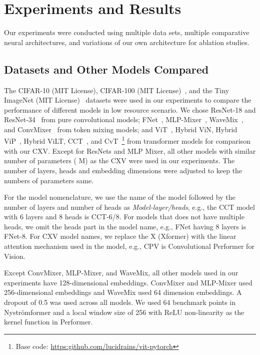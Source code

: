 \documentclass{article}
\begin{document}
\section{Experiments and Results}

Our experiments were conducted using multiple data sets, multiple comparative neural architectures, and variations of our own architecture for ablation studies.

\subsection{Datasets and Other Models Compared}

The CIFAR-10 (MIT License), CIFAR-100 (MIT License)~\cite{Krizhevsky09learningmultiple}, and the Tiny ImageNet (MIT License)~\cite{Le2015TinyIV} datasets were used in our experiments to compare the performance of different models in low resource scenario. We chose ResNet-18 and ResNet-34~\cite{he2015deep} from pure convolutional models; FNet~\cite{leethorp2021fnet}, MLP-Mixer~\cite{tolstikhin2021mlpmixer}, WaveMix~\cite{p2022wavemix}, and ConvMixer~\cite{anonymous2022patches} from token mixing models; and ViT~\cite{dosovitskiy2021image}, Hybrid ViN, Hybrid ViP~\cite{jeevan2021vision}, Hybrid ViLT, CCT~\cite{hassani2021escaping}, and CvT~\cite{wu2021cvt}\footnote{Base code: \href{https://github.com/lucidrains/vit-pytorch}{https:github.com/lucidrains/vit-pytorch}} from transformer models for comparison with our CXV. Except for ResNets and MLP Mixer, all other models with similar number of parameters ( M) as the CXV were used in our experiments. The number of layers, heads and embedding dimensions were adjusted to keep the numbers of parameters same. 

For the model nomenclature, we use the name of the model followed by the number of layers and number of heads as \emph{Model-layer/heads}, e.g., the CCT model with 6 layers and 8 heads is CCT-6/8. For models that does not have multiple heads, we omit the heads part in the model name, e.g., FNet having 8 layers is FNet-8. For CXV model names, we replace the X (Xformer) with the linear attention mechanism used in the model, e.g., CPV is Convolutional Performer for Vision.

Except ConvMixer, MLP-Mixer, and WaveMix, all other models used in our experiments have 128-dimensional embeddings. ConvMixer and MLP-Mixer used 256-dimensional embeddings and WaveMix used 64 dimension embeddings. A dropout of 0.5 was used across all models. We used 64 benchmark points in Nyströmformer and a local window size of 256 with ReLU non-linearity as the kernel function in Performer. 
\end{document}
